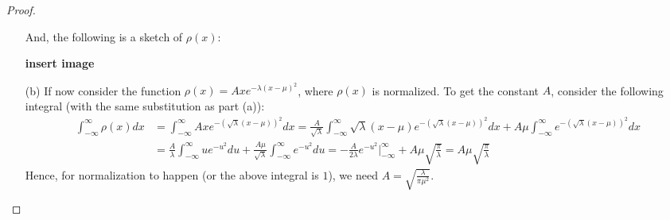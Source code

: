 \documentclass{article}
\begin{document}
\begin{proof}
\begin{itemize}
        And, the following is a sketch of $\rho(x)$:

        \textbf{insert image}

        \item[(b)] If now consider the function $\rho(x)=A xe^{-\lambda(x-\mu)^2}$, where $\rho(x)$ is normalized. To get the constant $A$, consider the following integral (with the same substitution as part (a)):
        \begin{align}
            \int_{-\infty}^{\infty}\rho(x)dx &= \int_{-\infty}^{\infty}A xe^{-(\sqrt{\lambda}(x-\mu))^2}dx = \frac{A}{\sqrt{\lambda}}\int_{-\infty}^{\infty}\sqrt{\lambda}(x-\mu)e^{-(\sqrt{\lambda}(x-\mu))^2}dx + A\mu\int_{-\infty}^{\infty}e^{-(\sqrt{\lambda}(x-\mu))^2}dx\\
            &= \frac{A}{\lambda}\int_{-\infty}^{\infty}ue^{-u^2}du + \frac{A\mu}{\sqrt{\lambda}}\int_{-\infty}^{\infty}e^{-u^2}du = -\frac{A}{2\lambda}e^{-u^2}\bigg|_{-\infty}^{\infty} + A\mu\sqrt{\frac{\pi}{\lambda}} = A\mu\sqrt{\frac{\pi}{\lambda}}
        \end{align}
        Hence, for normalization to happen (or the above integral is $1$), we need $A=\sqrt{\frac{\lambda}{\pi \mu^2}}$.

        \hfil


\end{itemize}
\end{proof}
\end{document}
